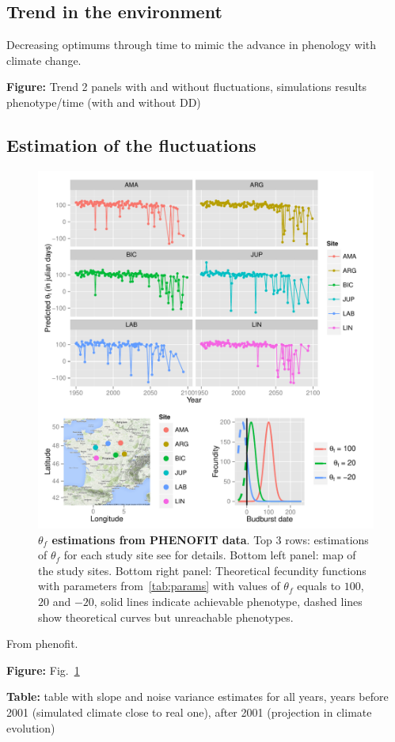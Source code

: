 \subsection*{Trend in the environment}

Decreasing optimums through time to mimic the advance in phenology with climate change.

\textbf{Figure:} Trend 2 panels with and without fluctuations, simulations results phenotype/time (with and without DD)

\subsection*{Estimation of the fluctuations}

\begin{figure}[ht!]
	\centering
	\includegraphics[scale=1]{Figures/optsmaps.pdf}
	\caption{\textbf{$\theta_{f}$ estimations from PHENOFIT data}. Top 3 rows: estimations of $\theta_f$ for each study site see  for details. Bottom left panel: map of the study sites. Bottom right panel: Theoretical fecundity functions with parameters from~\autoref{tab:params} with values of $\theta_f$ equals to $100$, $20$ and $-20$, solid lines indicate achievable phenotype, dashed lines show theoretical curves but unreachable phenotypes.}
	\label{fig:thetaf}
\end{figure}

From phenofit.

\textbf{Figure:} Fig.~\ref{fig:thetaf}

\textbf{Table:} table with slope and noise variance estimates for all years, years before 2001 (simulated climate close to real one), after 2001 (projection in climate evolution)